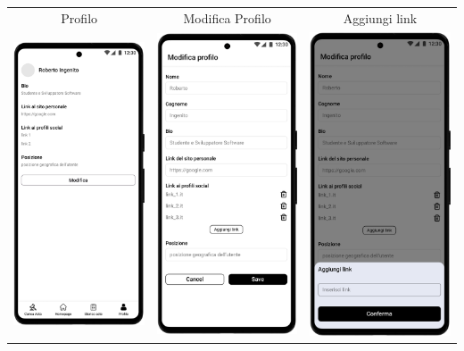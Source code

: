 \begin{center}
	\begin{tabular}{ccc}
		Profilo                                                                         &
		Modifica Profilo                                                                &
		Aggiungi link                                                                                   \\
		\includegraphics[width=.3\textwidth]{images/mockup/Profile Page.png}            &
		\includegraphics[width=.3\textwidth]{images/mockup/Profile Page - modifica.png} &
		\includegraphics[width=.3\textwidth]{images/mockup/Profile Page - modifica - aggiungi link.png} \\
	\end{tabular}
\end{center}

